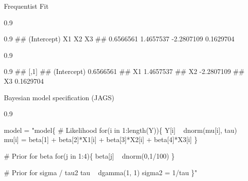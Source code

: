 \documentclass[11pt,ignorenonframetext,]{beamer}
\newenvironment{Shaded}{}{}
\newcommand{\DataTypeTok}[1]{\textcolor[rgb]{0.56,0.13,0.00}{#1}}
\newcommand{\KeywordTok}[1]{\textcolor[rgb]{0.00,0.44,0.13}{\textbf{#1}}}
\newcommand{\NormalTok}[1]{#1}
\newcommand{\OperatorTok}[1]{\textcolor[rgb]{0.40,0.40,0.40}{#1}}
\newcommand{\StringTok}[1]{\textcolor[rgb]{0.25,0.44,0.63}{#1}}
\let\oldShaded\Shaded
\let\endoldShaded\endShaded
\renewenvironment{Shaded}{\footnotesize\begin{spacing}{0.9}\oldShaded}{\endoldShaded\end{spacing}}
\let\oldverbatim\verbatim
\let\endoldverbatim\endverbatim
\renewenvironment{verbatim}{\footnotesize\begin{spacing}{0.9}\oldverbatim}{\endoldverbatim\end{spacing}}
\begin{document}
\begin{frame}[fragile,t]{Frequentist Fit}
\protect\hypertarget{frequentist-fit}{}

\begin{Shaded}
\end{Shaded}

\begin{verbatim}
## (Intercept)          X1          X2          X3 
##   0.6566561   1.4657537  -2.2807109   0.1629704
\end{verbatim}

\begin{Shaded}
\end{Shaded}

\begin{verbatim}
##                   [,1]
## (Intercept)  0.6566561
## X1           1.4657537
## X2          -2.2807109
## X3           0.1629704
\end{verbatim}

\end{frame}

\begin{frame}[fragile,t]{Bayesian model specification (JAGS)}
\protect\hypertarget{bayesian-model-specification-jags}{}

\begin{Shaded}
\begin{Highlighting}[]
\NormalTok{model =}\StringTok{ }
\StringTok{"model\{}
\StringTok{  # Likelihood}
\StringTok{  for(i in 1:length(Y))\{}
\StringTok{    Y[i] ~ dnorm(mu[i], tau)}
\StringTok{    mu[i] = beta[1] + beta[2]*X1[i] + beta[3]*X2[i] + beta[4]*X3[i]}
\StringTok{  \}}

\StringTok{  # Prior for beta}
\StringTok{  for(j in 1:4)\{}
\StringTok{    beta[j] ~ dnorm(0,1/100)}
\StringTok{  \}}

\StringTok{  # Prior for sigma / tau2}
\StringTok{  tau ~ dgamma(1, 1)}
\StringTok{  sigma2 = 1/tau}
\StringTok{\}"}
\end{Highlighting}
\end{Shaded}

\end{frame}
\end{document}
